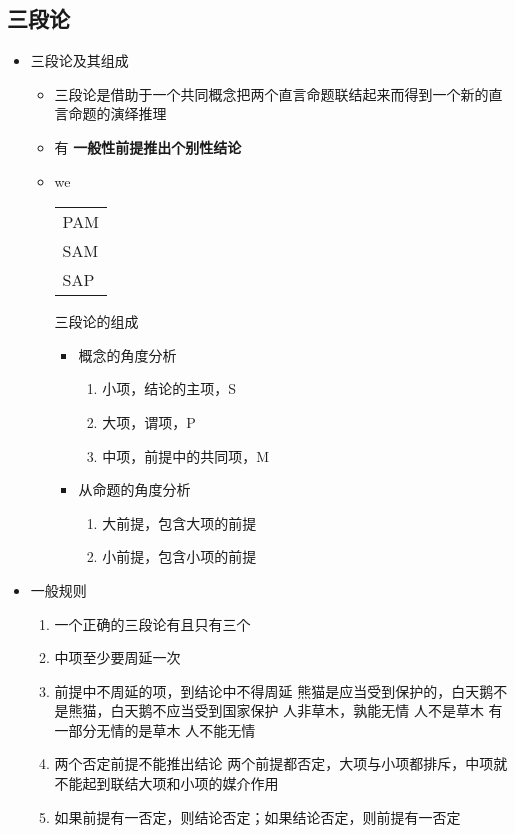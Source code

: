 \documentclass[11pt]{article}
\begin{document}
\subsection{三段论}
\label{sec-4-3}
\begin{itemize}
\item 三段论及其组成
\begin{itemize}
\item 三段论是借助于一个共同概念把两个直言命题联结起来而得到一个新的直言命题的演绎推理
\item 有 \textbf{一般性前提推出个别性结论}
\item we
\begin{center}
\begin{tabular}{l}
PAM\\
SAM\\
\hline
SAP\\
\end{tabular}
\end{center}
\item[{三段论的组成}] \begin{itemize}
\item 概念的角度分析
\begin{enumerate}
\item 小项，结论的主项，S
\item 大项，谓项，P
\item 中项，前提中的共同项，M
\end{enumerate}
\item 从命题的角度分析
\begin{enumerate}
\item 大前提，包含大项的前提
\item 小前提，包含小项的前提
\end{enumerate}
\end{itemize}
\end{itemize}
\item 一般规则
\begin{enumerate}
\item 一个正确的三段论有且只有三个
\item 中项至少要周延一次
\item 前提中不周延的项，到结论中不得周延
熊猫是应当受到保护的，白天鹅不是熊猫，白天鹅不应当受到国家保护
人非草木，孰能无情
人不是草木
有一部分无情的是草木
人不能无情
\item 两个否定前提不能推出结论
两个前提都否定，大项与小项都排斥，中项就不能起到联结大项和小项的媒介作用
\item 如果前提有一否定，则结论否定；如果结论否定，则前提有一否定

\end{enumerate}
\end{itemize}
\end{document}

